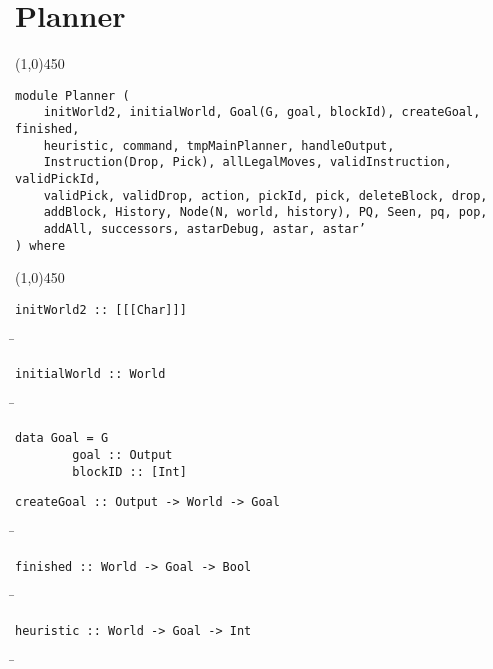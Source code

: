 \section{Planner}
\begin{center}
\line(1,0){450}
\end{center}
\begin{verbatim}
module Planner (
    initWorld2, initialWorld, Goal(G, goal, blockId), createGoal, finished,
    heuristic, command, tmpMainPlanner, handleOutput,
    Instruction(Drop, Pick), allLegalMoves, validInstruction, validPickId,
    validPick, validDrop, action, pickId, pick, deleteBlock, drop,
    addBlock, History, Node(N, world, history), PQ, Seen, pq, pop,
    addAll, successors, astarDebug, astar, astar’
) where
\end{verbatim}
\begin{center}
\line(1,0){450}
\end{center}
\begin{verbatim}
initWorld2 :: [[[Char]]]
\end{verbatim}
\begin{tabbing}
\hspace*{1cm}\= \kill
\> 
\end{tabbing}
\begin{verbatim}
initialWorld :: World
\end{verbatim}
\begin{tabbing}
\hspace*{1cm}\= \kill
\> 
\end{tabbing}
\begin{verbatim}
data Goal = G
        goal :: Output
        blockID :: [Int]
\end{verbatim}
\begin{verbatim}
createGoal :: Output -> World -> Goal
\end{verbatim}
\begin{tabbing}
\hspace*{1cm}\= \kill
\> 
\end{tabbing}
\begin{verbatim}
finished :: World -> Goal -> Bool
\end{verbatim}
\begin{tabbing}
\hspace*{1cm}\= \kill
\> 
\end{tabbing}
\begin{verbatim}
heuristic :: World -> Goal -> Int
\end{verbatim}
\begin{tabbing}
\hspace*{1cm}\= \kill
\> 
\end{tabbing}
